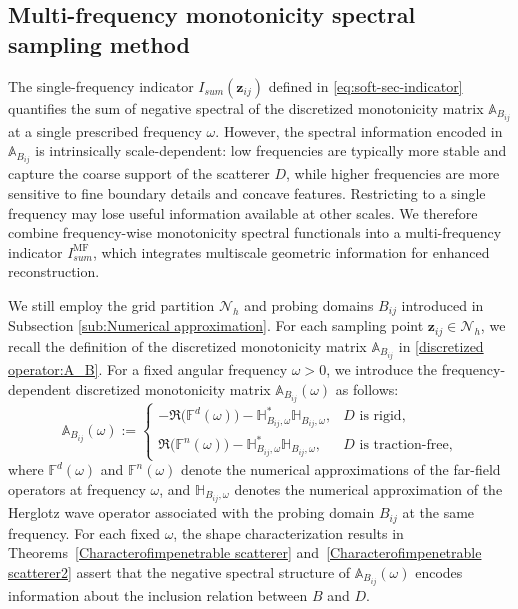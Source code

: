 \documentclass[11pt,reqno,twoside]{amsart}
\theoremstyle{definition}
\theoremstyle{remark}
\numberwithin{equation}{section}
\begin{document}
\subsection{Multi-frequency monotonicity spectral sampling method}

The single-frequency indicator $I_{sum}(\mathbf{z}_{ij})$ defined in \eqref{eq:soft-sec-indicator} quantifies the sum of negative spectral of the discretized monotonicity matrix $\mathbb A_{B_{ij}}$ at a single prescribed frequency $\omega$. However, the spectral information encoded in $\mathbb A_{B_{ij}}$ is intrinsically scale-dependent: low frequencies are typically more stable and capture the coarse support of the scatterer $D$, while higher frequencies are more sensitive to fine boundary details and concave features. Restricting to a single frequency may lose useful information available at other scales. We therefore combine frequency-wise monotonicity spectral functionals into a multi-frequency indicator $I_{sum}^{\mathrm{MF}}$, which integrates multiscale geometric information for enhanced reconstruction.

We still employ the grid partition \(\mathcal{N}_h\) and probing domains \(B_{ij}\) introduced in Subsection \ref{sub:Numerical approximation}. For each sampling point $\mathbf{z}_{ij}\in\mathcal{N}_h$, we recall the definition of the discretized monotonicity matrix $\mathbb A_{B_{ij}}$ in \eqref{discretized operator:A_B}. For a fixed angular frequency $\omega > 0$, we introduce the frequency-dependent discretized monotonicity matrix $\mathbb A_{B_{ij}}(\omega)$ as follows:
\begin{equation*}%
\mathbb A_{B_{ij}}(\omega)
:=
\begin{cases}
 -\Re\bigl(\mathbb{F}^d(\omega)\bigr) - \mathbb{H}_{B_{ij},\omega}^*\mathbb{H}_{B_{ij},\omega}, & \text{$D$ is rigid,} \\[6pt]
 \Re\bigl(\mathbb{F}^n(\omega)\bigr)  - \mathbb{H}_{B_{ij},\omega}^*\mathbb{H}_{B_{ij},\omega}, & \text{$D$ is traction-free,}
\end{cases}
\end{equation*}
where $\mathbb{F}^{d}(\omega)$ and $\mathbb{F}^{n}(\omega)$ denote the numerical approximations of the far-field operators at frequency $\omega$, and $\mathbb{H}_{B_{ij},\omega}$ denotes the numerical approximation of the Herglotz wave operator associated with the probing domain $B_{ij}$ at the same frequency. For each fixed $\omega$, the shape characterization results in Theorems~\ref{Characterofimpenetrable scatterer} and~\ref{Characterofimpenetrable scatterer2} assert that the negative spectral structure of $\mathbb A_{B_{ij}}(\omega)$ encodes information about the inclusion relation between $B$ and $D$.
\end{document}

